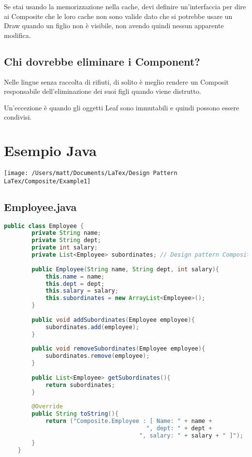 Se stai usando la memorizzazione nella cache, devi definire un'interfaccia per dire ai Composite che le loro cache non sono valide dato che si potrebbe usare un Draw quando un figlio non è visibile, non avendo quindi nessun apparente modifica.

\subsection{Chi dovrebbe eliminare i Component?}
Nelle lingue senza raccolta di rifiuti, di solito è meglio rendere un Composit responsabile dell'eliminazione dei suoi figli quando viene distrutto.

Un'eccezione è quando gli oggetti Leaf sono immutabili e quindi possono essere condivisi.


\section{Esempio Java}
\texttt{[image: /Users/matt/Documents/LaTex/Design Pattern LaTex/Composite/Example1]}

\subsection{Employee.java}
\begin{lstlisting}[language=java]
    public class Employee {
        private String name;
        private String dept;
        private int salary;
        private List<Employee> subordinates; // Design pattern Composite
    
        public Employee(String name, String dept, int salary){
            this.name = name;
            this.dept = dept;
            this.salary = salary;
            this.subordinates = new ArrayList<Employee>();
        }
    
        public void addSubordinates(Employee employee){
            subordinates.add(employee);
        }
    
        public void removeSubordinates(Employee employee){
            subordinates.remove(employee);
        }
    
        public List<Employee> getSubordinates(){
            return subordinates;
        }
    
        @Override
        public String toString(){
            return ("Composite.Employee : [ Name: " + name +
                                         ", dept: " + dept +
                                       ", salary: " + salary + " ]");
        }
    }
\end{lstlisting}


